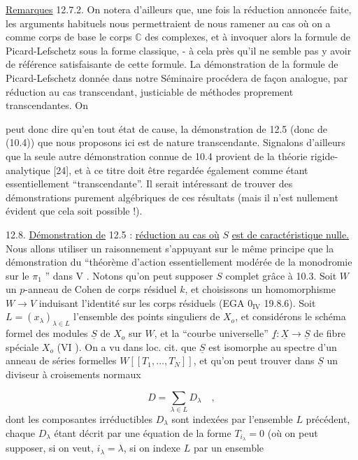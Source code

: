 \underline{Remarques} 12.7.2. On notera d'ailleurs que, une fois la réduction annoncée faite, les arguments habituels nous permettraient de nous ramener au cas où on a comme corps de base le corps $\mathbb{C}$ des complexes, et à invoquer alors la formule de Picard-Lefschetz sous la forme classique, - à cela près qu'il ne semble pas y avoir de référence satisfaisante de cette formule. La démonstration de la formule de Picard-Lefschetz donnée dans notre Séminaire procédera de façon analogue, par réduction au cas transcendant, justiciable de méthodes proprement transcendantes. On



peut donc dire qu'en tout état de cause, la démonstration de 12.5 (donc de (10.4)) que nous proposons ici est de nature transcendante. Signalons d'ailleurs que la seule autre démonstration connue de 10.4 provient de la théorie rigide-analytique [24], et à ce titre doit être regardée également comme étant essentiellement ``transcendante''. Il serait intéressant de trouver des démonstrations purement algébriques de ces résultats (mais il n'est nullement évident que cela soit possible !).

12.8. \underline{Démonstration de} 12.5 : \underline{réduction au cas où} $S$ \underline{est de caractéristique nulle.} Nous allons utiliser un raisonnement s'appuyant sur le même principe que la démonstration du ``théorème d'action essentiellement modérée de la monodromie sur le $\pi_1$ '' dans V \hspace{4em}. Notons qu'on peut supposer $S$ complet grâce à 10.3. Soit $W$ un $p$-anneau de Cohen de corps résiduel $k$, et choisissons un homomorphisme $W \longrightarrow V$ induisant l'identité sur les corps résiduels (EGA $0_{\mathrm{IV}}$ 19.8.6). Soit $L = (x_\lambda)_{\lambda \in L}$ l'ensemble des points singuliers de $X_o$, et considérons le schéma formel des modules $\underline{S}$ de $X_o$ sur $W$, et la ``courbe universelle'' $\underline{f} : \underline{X} \longrightarrow \underline{S}$ de fibre spéciale $X_o$ (VI \hspace{3em}). On a vu dans loc. cit. que $\underline{S}$ est isomorphe au spectre d'un anneau de séries formelles $W[[T_1,\ldots,T_N]]$, et qu'on peut trouver dans $\underline{S}$ un diviseur à croisements normaux

\begin{equation}\tag{12.8.1}
D = \sum_{\lambda \in L} D_\lambda \quad ,
\end{equation}
dont les composantes irréductibles $D_\lambda$ sont indexées par l'ensemble $L$ précédent, chaque $D_\lambda$ étant décrit par une équation de la forme $T_{i_\lambda} = 0$ (où on peut supposer, si on veut, $i_\lambda = \lambda$, si on indexe $L$ par un ensemble


